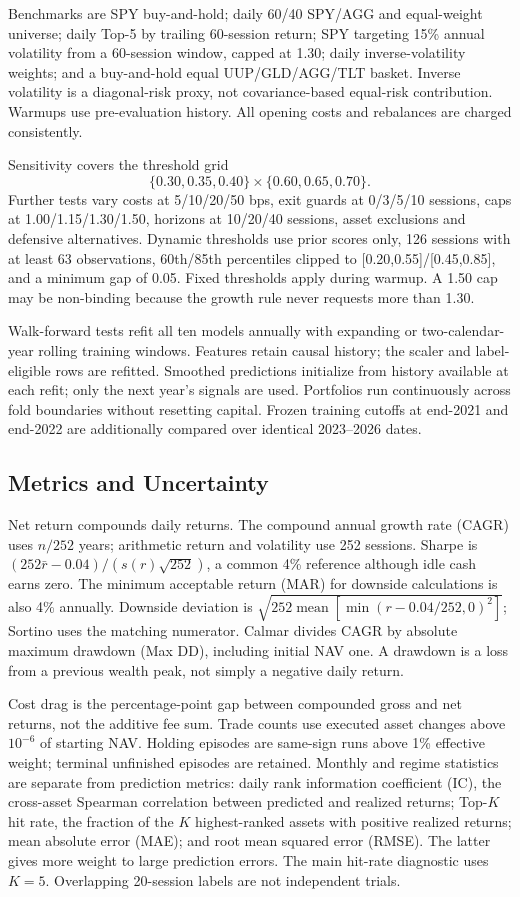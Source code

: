 \documentclass[3p,times]{elsarticle}
\begin{document}
Benchmarks are SPY buy-and-hold; daily 60/40 SPY/AGG and equal-weight universe; daily Top-5 by trailing 60-session return; SPY targeting 15\% annual volatility from a 60-session window, capped at 1.30; daily inverse-volatility weights; and a buy-and-hold equal UUP/GLD/AGG/TLT basket. Inverse volatility is a diagonal-risk proxy, not covariance-based equal-risk contribution. Warmups use pre-evaluation history. All opening costs and rebalances are charged consistently.

Sensitivity covers the threshold grid
\[\{0.30,0.35,0.40\}\times\{0.60,0.65,0.70\}.\]
Further tests vary costs at 5/10/20/50 bps, exit guards at 0/3/5/10 sessions, caps at 1.00/1.15/1.30/1.50, horizons at 10/20/40 sessions, asset exclusions and defensive alternatives. Dynamic thresholds use prior scores only, 126 sessions with at least 63 observations, 60th/85th percentiles clipped to [0.20,0.55]/[0.45,0.85], and a minimum gap of 0.05. Fixed thresholds apply during warmup. A 1.50 cap may be non-binding because the growth rule never requests more than 1.30.

Walk-forward tests refit all ten models annually with expanding or two-calendar-year rolling training windows. Features retain causal history; the scaler and label-eligible rows are refitted. Smoothed predictions initialize from history available at each refit; only the next year's signals are used. Portfolios run continuously across fold boundaries without resetting capital. Frozen training cutoffs at end-2021 and end-2022 are additionally compared over identical 2023--2026 dates.

\subsection{Metrics and Uncertainty}
Net return compounds daily returns. The compound annual growth rate (CAGR) uses $n/252$ years; arithmetic return and volatility use 252 sessions. Sharpe is $(252\bar r-0.04)/(s(r)\sqrt{252})$, a common 4\% reference although idle cash earns zero. The minimum acceptable return (MAR) for downside calculations is also 4\% annually. Downside deviation is $\sqrt{252\operatorname{mean}[\min(r-0.04/252,0)^2]}$; Sortino uses the matching numerator. Calmar divides CAGR by absolute maximum drawdown (Max DD), including initial NAV one. A drawdown is a loss from a previous wealth peak, not simply a negative daily return.

Cost drag is the percentage-point gap between compounded gross and net returns, not the additive fee sum. Trade counts use executed asset changes above $10^{-6}$ of starting NAV. Holding episodes are same-sign runs above 1\% effective weight; terminal unfinished episodes are retained. Monthly and regime statistics are separate from prediction metrics: daily rank information coefficient (IC), the cross-asset Spearman correlation between predicted and realized returns; Top-$K$ hit rate, the fraction of the $K$ highest-ranked assets with positive realized returns; mean absolute error (MAE); and root mean squared error (RMSE). The latter gives more weight to large prediction errors. The main hit-rate diagnostic uses $K=5$. Overlapping 20-session labels are not independent trials.
\end{document}
